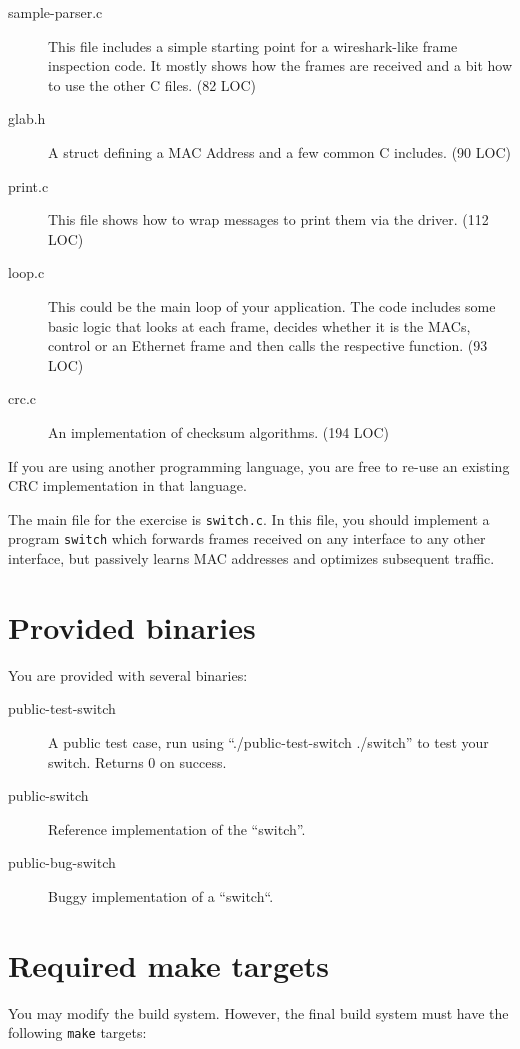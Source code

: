 \documentclass{article}
\begin{document}
\begin{description}
\item[sample-parser.c]{This file includes a simple starting point for
  a wireshark-like frame inspection code.
  It mostly shows how the frames are received and
  a bit how to use the other C files. (82 LOC)}
\item[glab.h]{A struct defining a MAC Address and a few common C includes. (90 LOC)}
\item[print.c]{This file shows how to wrap messages to print them
  via the driver. (112 LOC)}
\item[loop.c]{This could be the main loop of your application. The code includes
  some basic logic that looks at each frame, decides whether it is the MACs,
  control or an Ethernet frame and then calls the respective function. (93 LOC)}
\item[crc.c]{An implementation of checksum algorithms. (194 LOC)}
\end{description}

If you are using another programming language, you are free to re-use
an existing CRC implementation in that language.


The main file for the exercise is {\tt switch.c}. In this file, you should
implement a program {\tt switch} which forwards frames received on any
interface to any other interface, but passively learns MAC addresses
and optimizes subsequent traffic.


\section{Provided binaries} \label{sec:binaries}

You are provided with several binaries:
\begin{description}
\item[public-test-switch] A public test case, run using ``./public-test-switch ./switch''
  to test your switch. Returns 0 on success.
\item[public-switch] Reference implementation of the ``switch''.
\item[public-bug-switch] Buggy implementation of a ``switch``.
\end{description}


\section{Required make targets}

You may modify the build system. However, the final build system must
have the following {\tt make} targets:
\end{document}
